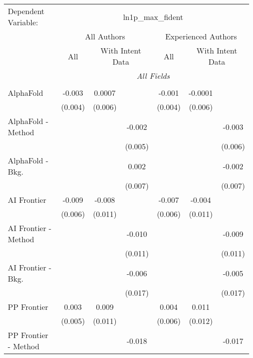 \begingroup
\centering
\begin{tabular}{lcccccc}
   \tabularnewline \midrule \midrule
   Dependent Variable: & \multicolumn{6}{c}{ln1p\_max\_fident}\\
 & \multicolumn{3}{c}{All Authors} & \multicolumn{3}{c}{Experienced Authors} \\
\cmidrule(lr){2-4} \cmidrule(lr){5-7}
 & \multicolumn{1}{c}{All} & \multicolumn{2}{c}{With Intent Data} & \multicolumn{1}{c}{All} & \multicolumn{2}{c}{With Intent Data} \\
\cmidrule(lr){2-2} \cmidrule(lr){3-4} \cmidrule(lr){5-5} \cmidrule(lr){6-7}
 & \multicolumn{6}{c}{\textit{All Fields}} \\ \\
   AlphaFold            & -0.003  & 0.0007  &             & -0.001  & -0.0001 &   \\   
                        & (0.004) & (0.006) &             & (0.004) & (0.006) &   \\   
   AlphaFold - Method   &         &         & -0.002      &         &         & -0.003\\   
                        &         &         & (0.005)     &         &         & (0.006)\\   
   AlphaFold - Bkg.     &         &         & 0.002       &         &         & -0.002\\   
                        &         &         & (0.007)     &         &         & (0.007)\\   
   AI Frontier          & -0.009  & -0.008  &             & -0.007  & -0.004  &   \\   
                        & (0.006) & (0.011) &             & (0.006) & (0.011) &   \\   
   AI Frontier - Method &         &         & -0.010      &         &         & -0.009\\   
                        &         &         & (0.011)     &         &         & (0.011)\\   
   AI Frontier - Bkg.   &         &         & -0.006      &         &         & -0.005\\   
                        &         &         & (0.017)     &         &         & (0.017)\\   
   PP Frontier          & 0.003   & 0.009   &             & 0.004   & 0.011   &   \\   
                        & (0.005) & (0.011) &             & (0.006) & (0.012) &   \\   
   PP Frontier - Method &         &         & -0.018      &         &         & -0.017\\   

\end{tabular}
